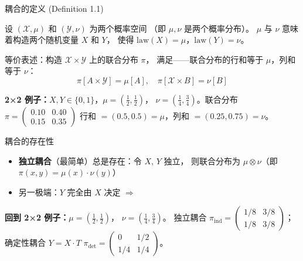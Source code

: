 \documentclass[aspectratio=169,10pt]{beamer}
\begin{document}
\begin{frame}{耦合的定义 (Definition 1.1)}
  \begin{TLtext}
    设 $(\mathcal{X},\mu)$ 和 $(\mathcal{Y},\nu)$ 为两个概率空间
    （即 $\mu,\nu$ 是两个概率分布）。
     $\mu$ 与 $\nu$ 意味着构造两个随机变量 $X$ 和 $Y$，
    使得 $\mathrm{law}(X)=\mu$，$\mathrm{law}(Y)=\nu$。
  \end{TLtext}

  \vspace{0.3em}
  等价表述：构造 $\mathcal{X}\times\mathcal{Y}$ 上的联合分布 $\pi$，
  满足——联合分布的行和等于 $\mu$，列和等于 $\nu$：
  \[
    \pi[A\times\mathcal{Y}]=\mu[A], \quad
    \pi[\mathcal{X}\times B]=\nu[B]
  \]

  \vspace{0.2em}
  {\small\textbf{2×2 例子：}$X,Y\in\{0,1\}$，$\mu=(\tfrac{1}{2},\tfrac{1}{2})$，
  $\nu=(\tfrac{1}{4},\tfrac{3}{4})$。联合分布\;
  $\pi=\begin{pmatrix}0.10 & 0.40 \\ 0.15 & 0.35\end{pmatrix}$\;
  行和 $=(0.5,0.5)=\mu$，列和 $=(0.25,0.75)=\nu$。}
\end{frame}

\begin{frame}{耦合的存在性}
  \begin{TLtext}
    \begin{itemize}
      \item \textbf{独立耦合}（最简单）总是存在：令 $X$, $Y$ 独立，
        则联合分布为 $\mu\otimes\nu$\;（即
        $\pi(x,y)=\mu(x)\cdot\nu(y)$）
      \item 另一极端：$Y$ 完全由 $X$ 决定 \enspace $\Longrightarrow$ \enspace
    \end{itemize}
  \end{TLtext}

  \vspace{0.3em}
  {\small\textbf{回到 2×2 例子：}$\mu=(\tfrac{1}{2},\tfrac{1}{2})$，
  $\nu=(\tfrac{1}{4},\tfrac{3}{4})$。\;
  独立耦合\;
  $\pi_{\mathrm{ind}}=\begin{pmatrix}1/8 & 3/8 \\ 1/8 & 3/8\end{pmatrix}$；\;
  确定性耦合 $Y=X\cdot T$\;
  $\pi_{\mathrm{det}}=\begin{pmatrix}0 & 1/2 \\ 1/4 & 1/4\end{pmatrix}$。}

  \vspace{0.3em}
\end{frame}
\end{document}
